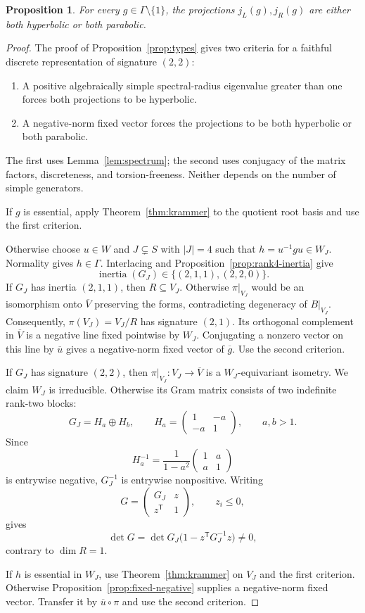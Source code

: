 \documentclass[11pt,reqno]{amsart}
\theoremstyle{plain}
\newtheorem{proposition}[theorem]{Proposition}
\theoremstyle{definition}
\theoremstyle{remark}
\numberwithin{equation}{section}
\begin{document}
\begin{proposition}\label{prop:rank5-types}
For every $g\in\Gamma\setminus\{1\}$, the projections $j_L(g),j_R(g)$ are either both hyperbolic or both parabolic.
\end{proposition}
\begin{proof}
The proof of Proposition~\ref{prop:types} gives two criteria for a faithful discrete representation of signature $(2,2)$:
\begin{enumerate}
\item A positive algebraically simple spectral-radius eigenvalue greater than one forces both projections to be hyperbolic.
\item A negative-norm fixed vector forces the projections to be both hyperbolic or both parabolic.
\end{enumerate}
The first uses Lemma~\ref{lem:spectrum}; the second uses conjugacy of the matrix factors, discreteness, and torsion-freeness. Neither depends on the number of simple generators.

If $g$ is essential, apply Theorem~\ref{thm:krammer} to the quotient root basis and use the first criterion.

Otherwise choose $u\in W$ and $J\subsetneq S$ with $|J|=4$ such that $h=u^{-1}gu\in W_J$. Normality gives $h\in\Gamma$. Interlacing and Proposition~\ref{prop:rank4-inertia} give
\[
\operatorname{inertia}(G_J)\in\{(2,1,1),(2,2,0)\}.
\]
If $G_J$ has inertia $(2,1,1)$, then $R\subseteq V_J$. Otherwise $\pi|_{V_J}$ would be an isomorphism onto $\overline V$ preserving the forms, contradicting degeneracy of $B|_{V_J}$. Consequently, $\pi(V_J)=V_J/R$ has signature $(2,1)$. Its orthogonal complement in $\overline V$ is a negative line fixed pointwise by $W_J$. Conjugating a nonzero vector on this line by $\overline u$ gives a negative-norm fixed vector of $\overline g$. Use the second criterion.

If $G_J$ has signature $(2,2)$, then $\pi|_{V_J}:V_J\to\overline V$ is a $W_J$-equivariant isometry. We claim $W_J$ is irreducible. Otherwise its Gram matrix consists of two indefinite rank-two blocks:
\[
G_J=H_a\oplus H_b,\qquad
H_a=\begin{pmatrix}1&-a\\-a&1\end{pmatrix},\qquad a,b>1.
\]
Since
\[
H_a^{-1}=\frac{1}{1-a^2}\begin{pmatrix}1&a\\a&1\end{pmatrix}
\]
is entrywise negative, $G_J^{-1}$ is entrywise nonpositive. Writing
\[
G=\begin{pmatrix}G_J&z\\z^{\mathsf T}&1\end{pmatrix},\qquad z_i\leq0,
\]
gives
\[
\det G=\det G_J\bigl(1-z^{\mathsf T}G_J^{-1}z\bigr)\neq0,
\]
contrary to $\dim R=1$.

If $h$ is essential in $W_J$, use Theorem~\ref{thm:krammer} on $V_J$ and the first criterion. Otherwise Proposition~\ref{prop:fixed-negative} supplies a negative-norm fixed vector. Transfer it by $\overline u\circ\pi$ and use the second criterion.
\end{proof}
\end{document}
